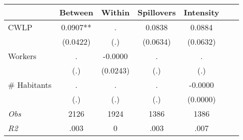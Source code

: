 \begin{tabular}{l*{6}{c}}\hline&\multicolumn{1}{c}{Between}&\multicolumn{1}{c}{Within}&\multicolumn{1}{c}{Spillovers}&\multicolumn{1}{c}{Intensity}\\ \hline 
CWLP & 0.0907** & . & 0.0838 & 0.0884 \\
 & (0.0422) & (.) & (0.0634) & (0.0632) \\
Workers & . & -0.0000 & . & . \\
 & (.) & (0.0243) & (.) & (.) \\
\# Habitants & . & . & . & -0.0000 \\
  & (.) & (.) & (.) & (0.0000) \\
\hline \textit{Obs} & 2126 & 1924 & 1386 & 1386  \\ \textit{R2} & .003 & 0 & .003 & .007 \\ \hline \end{tabular}
